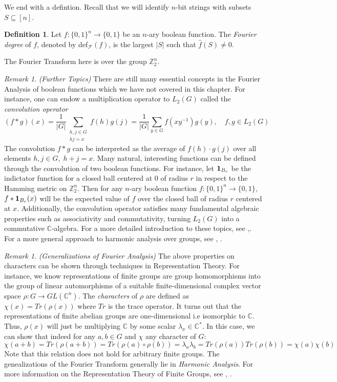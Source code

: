 \documentclass{amsart}
\theoremstyle{definition}
\newtheorem{definition}[theorem]{Definition}
\theoremstyle{remark}
\newtheorem{remark}[theorem]{Remark}
\numberwithin{equation}{section}
\theoremstyle{remark}
\begin{document}
%
We end with a defintion. Recall that we will identify $n$-bit strings with subsets $S \subseteq [n]$.
%
\begin{definition}
  Let $f:\{0,1\}^n \rightarrow \{0,1\}$ be an $n$-ary boolean function. The \emph{Fourier degree} of $f$, denoted by def$_{\mathcal{F}}(f)$, is the largest $|S|$ such that $\hat{f}(S) \neq 0$.
\end{definition}
%
The Fourier Transform here is over the group $\mathbb{Z}_2^n$.

\begin{remark}{\emph{(Further Topics)}}
  There are still many essential concepts in the Fourier Analysis of boolean functions which we have not covered in this chapter. For instance, one can endow a multiplication operator to $L_2(G)$ called the \emph{convolution operator}
  $$ (f * g)(x) = \frac{1}{|G|}\sum_{\substack{h,j \in G \\ hj = x}} f(h)g(j) = \frac{1}{|G|}\sum_{y \in G} f(xy^{-1})g(y), \quad f,g \in L_2(G)$$
   The convolution $f * g$ can be interpreted as the average of $f(h)\cdot g(j)$ over all elements $h,j \in G, \; h + j = x$. Many natural, interesting functions can be defined through the convolution of two boolean functions. For instance, let ${\bf 1}_{B_r}$ be the indictator function for a closed ball centered at $0$ of radius $r$ in respect to the Hamming metric on $\mathbb{Z}_2^n$. Then for any $n$-ary boolean function $f:\{0,1\}^n \rightarrow \{0,1\}$, $f * {\bf 1}_{B_r}(x)$ will be the expected value of $f$ over the closed ball of radius $r$ centered at $x$. Additionally, the convolution operator satisfies many fundamental algebraic properties such as associativity and commutativity, turning $L_2(G)$ into a commutative $\mathbb{C}$-algebra.
   For a more detailed introduction to these topics, see \cite{hatami},\cite{odonnell}. For a more general approach to harmonic analysis over groups, see \cite{rudin}, \cite{ceccherini}.
\end{remark}

\begin{remark}{\emph{(Generalizations of Fourier Analysis)}}
The above properties on characters can be shown through techniques in Representation Theory. For instance, we know representations of finite groups are group homomorphisms into the group of linear automorphisms of a suitable finite-dimensional complex vector space $\rho: G \rightarrow GL(\mathbb{C}^n)$. The \emph{characters} of $\rho$ are defined as $\chi(x) = Tr(\rho(x))$ where $Tr$ is the trace operator. It turns out that the representations of finite abelian groups are one-dimensional i.e isomorphic to $\mathbb{C}$. Thus, $\rho(x)$ will just be multiplying $\mathbb{C}$ by some scalar $\lambda_x \in \mathbb{C}^*$. In this case, we can show that indeed for any $a,b \in G$ and $\chi$ any character of $G$:
$$ \chi(a+b) = Tr(\rho(a+b)) = Tr(\rho(a)\circ\rho(b)) = \lambda_a \lambda_b = Tr(\rho(a))Tr(\rho(b)) = \chi(a)\chi(b)$$ Note that this relation does not hold for arbitrary finite groups. The genealizations of the Fourier Transform generally lie in \emph{Harmonic Analysis}. For more information on the Representation Theory of Finite Groups, see \cite{serre}, \cite{webb}.
\end{remark}
\end{document}
